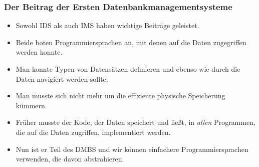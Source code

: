 \documentclass[aspectratio=169,mathserif,notheorems]{beamer}%
\begin{document}
\begin{frame}%
\frametitle{Der Beitrag der Ersten Datenbankmanagementsysteme}%
\begin{itemize}%
\item Sowohl IDS als auch IMS haben wichtige Beiträge geleistet.%
\item<2-> Beide boten Programmiersprachen an, mit denen auf die Daten zugegriffen werden konnte.%
\item<3-> Man konnte Typen von Datensätzen definieren und ebenso wie durch die Daten navigiert werden sollte.%
\item<4-> Man musste sich nicht mehr um die effiziente physische Speicherung kümmern.%
\item<5-> Früher musste der Kode, der Daten speichert und ließt, in \emph{allen} Programmen, die auf die Daten zugriffen, implementiert werden.%
\item<6-> Nun ist er Teil des DMBS und wir können einfachere Programmiersprachen verwenden, die davon abstrahieren.%
\end{itemize}%
\end{frame}%
%
\end{document}
